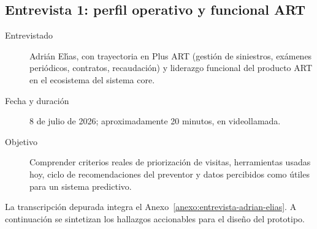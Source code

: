 \subsection{Entrevista 1: perfil operativo y funcional ART}

\begin{description}
	\item[Entrevistado] Adri\'an El\'{\i}as, con trayectoria en Plus ART (gesti\'on de siniestros, ex\'amenes peri\'odicos, contratos, recaudaci\'on) y liderazgo funcional del producto ART en el ecosistema del sistema core.
	\item[Fecha y duraci\'on] 8 de julio de 2026; aproximadamente 20 minutos, en videollamada.
	\item[Objetivo] Comprender criterios reales de priorizaci\'on de visitas, herramientas usadas hoy, ciclo de recomendaciones del preventor y datos percibidos como \'utiles para un sistema predictivo.
\end{description}

La transcripci\'on depurada integra el Anexo~\ref{anexo:entrevista-adrian-elias}. A continuaci\'on se sintetizan los hallazgos accionables para el dise\~no del prototipo.

